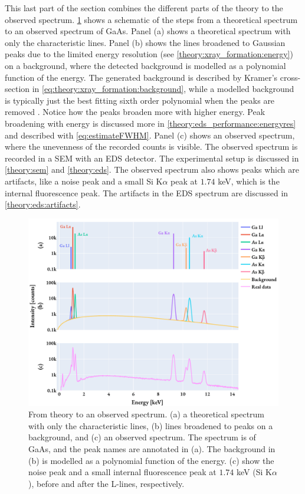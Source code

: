 This last part of the section combines the different parts of the theory to the observed spectrum.
\cref{fig:eds_theoretical2realSpectrum} shows a schematic of the steps from a theoretical spectrum to an observed spectrum of GaAs.
Panel (a) shows a theoretical spectrum with only the characteristic lines.
Panel (b) shows the lines broadened to Gaussian peaks due to the limited energy resolution (see \cref{theory:xray_formation:energy}) on a background, where the detected background is modelled as a polynomial function of the energy.
The generated background is described by Kramer's cross-section in \cref{eq:theory:xray_formation:background}, while a modelled background is typically just the best fitting sixth order polynomial when the peaks are removed \cite{hyperspy_1.7.1}.
Notice how the peaks broaden more with higher energy.
Peak broadening with energy is discussed more in \cref{theory:eds_performance:energyres} and described with \cref{eq:estimateFWHM}.
Panel (c) shows an observed spectrum, where the unevenness of the recorded counts is visible.
The observed spectrum is recorded in a SEM with an EDS detector.
The experimental setup is discussed in \cref{theory:sem} and \cref{theory:eds}.
The observed spectrum also shows peaks which are artifacts, like a noise peak and a small Si K$\alpha$ peak at $1.74$ keV, which is the internal fluorescence peak.
The artifacts in the EDS spectrum are discussed in \cref{theory:eds:artifacts}.


\begin{figure}[hbtp]
    \centering
    \includegraphics[width=0.99\linewidth]{figures/eds_theoretical2realSpectrum.pdf}
    \caption{
        From theory to an observed spectrum.
        (a) a theoretical spectrum with only the characteristic lines, (b) lines broadened to peaks on a background, and (c) an observed spectrum.
        The spectrum is of GaAs, and the peak names are annotated in (a).
        The background in (b) is modelled as a polynomial function of the energy.
        (c) show the noise peak and a small internal fluorescence peak at $1.74$ keV (Si K$\alpha$), before and after the L-lines, respectively.
    }
    \label{fig:eds_theoretical2realSpectrum}

\end{figure}


